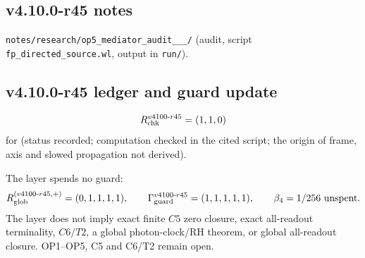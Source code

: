 \subsection*{v4.10.0-r45 notes}
\label{subsec:v4100-r45-notes}

\texttt{notes/\allowbreak research/\allowbreak op5\_\allowbreak mediator\_\allowbreak audit\_\_\_/} (audit, script \texttt{fp\_\allowbreak directed\_\allowbreak source.wl}, output in
\texttt{run/}).

\subsection*{v4.10.0-r45 ledger and guard update}
\label{subsec:v4100-r45-ledger-guard}

\[
R_{\rm chk}^{v4100\text{-}r45}=(1,1,0)
\]
for (status recorded; computation checked in the cited script; the origin of frame, axis and slowed propagation not derived).

The layer spends no guard:
\[
R_{\rm glob}^{(v4100\text{-}r45,+)}=(0,1,1,1,1),
\qquad
\Gamma_{\rm guard}^{v4100\text{-}r45}=(1,1,1,1,1),
\qquad
\beta_4=1/256\ \text{unspent}.
\]
The layer does not imply exact finite \(C5\) zero closure, exact all-readout terminality, \(C6/T2\), a global photon-clock/RH theorem,
or global all-readout closure.  OP1--OP5, C5 and C6/T2 remain open.
